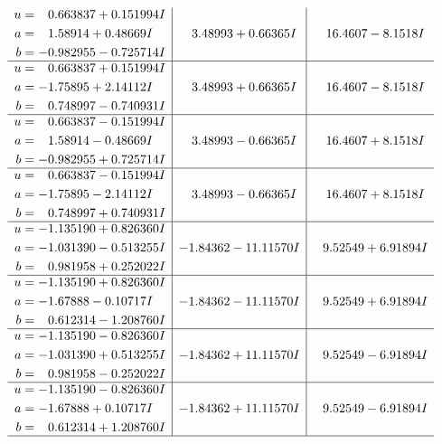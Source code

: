 \documentclass[1p]{elsarticle_modified}
\theoremstyle{definition}
\begin{document}
$$\begin{array}{c|c|c}
\begin{aligned}
u &= \phantom{-}0.663837 + 0.151994 I \\
a &= \phantom{-}1.58914 + 0.48669 I \\
b &= -0.982955 - 0.725714 I\end{aligned}
 & \phantom{-}3.48993 + 0.66365 I & \phantom{-}16.4607 - 8.1518 I \\ \hline\begin{aligned}
u &= \phantom{-}0.663837 + 0.151994 I \\
a &= -1.75895 + 2.14112 I \\
b &= \phantom{-}0.748997 - 0.740931 I\end{aligned}
 & \phantom{-}3.48993 + 0.66365 I & \phantom{-}16.4607 - 8.1518 I \\ \hline\begin{aligned}
u &= \phantom{-}0.663837 - 0.151994 I \\
a &= \phantom{-}1.58914 - 0.48669 I \\
b &= -0.982955 + 0.725714 I\end{aligned}
 & \phantom{-}3.48993 - 0.66365 I & \phantom{-}16.4607 + 8.1518 I \\ \hline\begin{aligned}
u &= \phantom{-}0.663837 - 0.151994 I \\
a &= -1.75895 - 2.14112 I \\
b &= \phantom{-}0.748997 + 0.740931 I\end{aligned}
 & \phantom{-}3.48993 - 0.66365 I & \phantom{-}16.4607 + 8.1518 I \\ \hline\begin{aligned}
u &= -1.135190 + 0.826360 I \\
a &= -1.031390 - 0.513255 I \\
b &= \phantom{-}0.981958 + 0.252022 I\end{aligned}
 & -1.84362 - 11.11570 I & \phantom{-}9.52549 + 6.91894 I \\ \hline\begin{aligned}
u &= -1.135190 + 0.826360 I \\
a &= -1.67888 - 0.10717 I \\
b &= \phantom{-}0.612314 - 1.208760 I\end{aligned}
 & -1.84362 - 11.11570 I & \phantom{-}9.52549 + 6.91894 I \\ \hline\begin{aligned}
u &= -1.135190 - 0.826360 I \\
a &= -1.031390 + 0.513255 I \\
b &= \phantom{-}0.981958 - 0.252022 I\end{aligned}
 & -1.84362 + 11.11570 I & \phantom{-}9.52549 - 6.91894 I \\ \hline\begin{aligned}
u &= -1.135190 - 0.826360 I \\
a &= -1.67888 + 0.10717 I \\
b &= \phantom{-}0.612314 + 1.208760 I\end{aligned}
 & -1.84362 + 11.11570 I & \phantom{-}9.52549 - 6.91894 I\\
 \hline 
 \end{array}$$\newpage\newpage\renewcommand{\arraystretch}{1}
\end{document}
